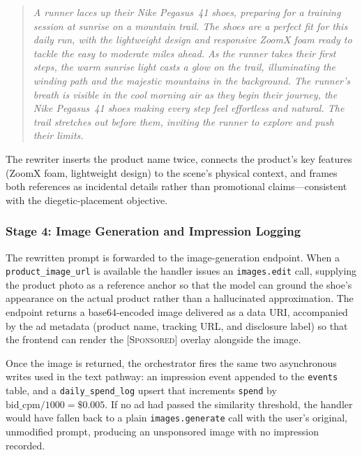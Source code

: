 \begin{quote}
\emph{A runner laces up their Nike Pegasus~41 shoes, preparing for a training
session at sunrise on a mountain trail.  The shoes are a perfect fit for this
daily run, with the lightweight design and responsive ZoomX foam ready to
tackle the easy to moderate miles ahead.  As the runner takes their first
steps, the warm sunrise light casts a glow on the trail, illuminating the
winding path and the majestic mountains in the background.  The runner's
breath is visible in the cool morning air as they begin their journey, the
Nike Pegasus~41 shoes making every step feel effortless and natural.  The
trail stretches out before them, inviting the runner to explore and push their
limits.}
\end{quote}

\noindent
The rewriter inserts the product name twice, connects the product's key
features (ZoomX foam, lightweight design) to the scene's physical context,
and frames both references as incidental details rather than promotional
claims---consistent with the diegetic-placement objective.

\subsubsection{Stage 4: Image Generation and Impression Logging}
\label{subsubsec:example6-response}

The rewritten prompt is forwarded to the image-generation endpoint.  When a
\texttt{product\_image\_url} is available the handler issues an
\texttt{images.edit} call, supplying the product photo as a reference anchor
so that the model can ground the shoe's appearance on the actual product
rather than a hallucinated approximation.  The endpoint returns a base64-encoded
image delivered as a data URI, accompanied by the ad metadata (product name,
tracking URL, and disclosure label) so that the frontend can render the
\textsc{[Sponsored]} overlay alongside the image.

Once the image is returned, the orchestrator fires the same two asynchronous
writes used in the text pathway: an impression event appended to the
\texttt{events} table, and a \texttt{daily\_spend\_log} upsert that
increments \texttt{spend} by $\text{bid\_cpm}/1000 = \$0.005$.  If no ad
had passed the similarity threshold, the handler would have fallen back to a
plain \texttt{images.generate} call with the user's original, unmodified
prompt, producing an unsponsored image with no impression recorded.
